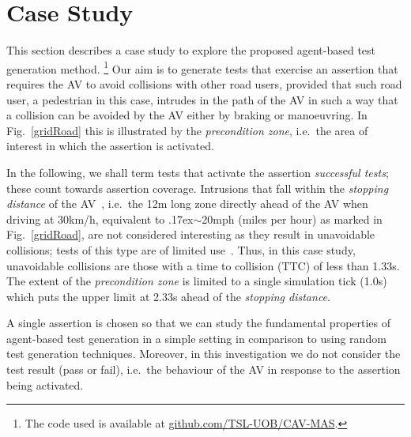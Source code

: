 \documentclass[letterpaper, 10 pt, journal, twoside]{IEEEtran}
\begin{document}
\section{Case Study} \label{s:case-study}
 
This section describes a case study to explore the proposed agent-based test generation method.%
\footnote{The code used is available at \url{github.com/TSL-UOB/CAV-MAS}.} %
%
Our aim is to generate tests that exercise an assertion that requires the AV to avoid collisions with other road users, provided that such road user, a pedestrian in this case, intrudes in the path of the AV in such a way that a collision can be avoided by the AV either by braking or manoeuvring. In Fig.~\ref{gridRoad} this is illustrated by the \textit{precondition zone}, i.e.\ the area of interest in which the assertion is activated.

In the following, we shall term tests that activate the assertion \textit{successful tests}; these count towards assertion coverage. 
%
Intrusions that fall within the \textit{stopping distance} of the AV~\cite{codes2015highway}, i.e.\ the 12m long zone 
directly ahead of the AV when driving at 30km/h, equivalent to {\raise.17ex\hbox{$\scriptstyle\sim$}}20mph (miles per hour) as marked in Fig.~\ref{gridRoad}, are not considered interesting as they result in unavoidable collisions; tests of this type are of limited use~\cite{Tuncali2018}. 
%
Thus, in this case study, unavoidable collisions are those with a time to collision (TTC) of less than 1.33s. The extent of the \textit{precondition zone} is limited to a single simulation tick (1.0s) which puts the upper limit at 2.33s ahead of the \textit{stopping distance}.%
%

A single assertion is chosen so that we can study the fundamental properties of agent-based test generation in a simple setting in comparison to using random test generation techniques.
%
Moreover, in this investigation we do not consider the test result (pass or fail), i.e.\ the behaviour of the AV in response to the assertion being activated. 
\end{document}
